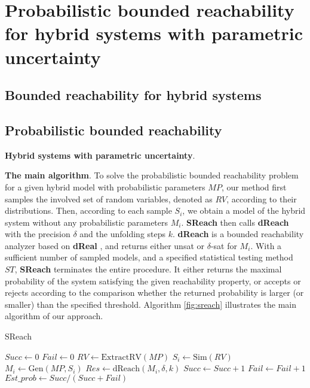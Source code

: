 \section{Probabilistic bounded reachability for hybrid systems with parametric uncertainty}
\subsection{Bounded reachability for hybrid systems}

\subsection{Probabilistic bounded reachability}
{\bf Hybrid systems with parametric uncertainty}.


{\bf The main algorithm}.
To solve the probabilistic bounded reachability problem for a given hybrid model with probabilistic parameters $MP$, our method first samples the involved set of random variables, denoted as $RV$, according to their distributions. Then, according to each sample $S_i$, we obtain a model of the hybrid system without any probabilistic parameters $M_i$. {\bf SReach} then calls {\bf dReach} \cite{gaodelta} with the precision $\delta$ and the unfolding steps $k$. {\bf dReach} is a bounded reachability analyzer based on {\bf dReal} \cite{gao2013dreal}, and returns either unsat or $\delta$-sat for $M_i$. With a sufficient number of sampled models, and a specified statistical testing method $ST$, {\bf SReach} terminates the entire procedure. It either returns the maximal probability of the system satisfying the given reachability property, or accepts or rejects according to the comparison whether the returned probability is larger (or smaller) than the specified threshold. Algorithm \ref{fig:sreach} illustrates the main algorithm of our approach.

\begin{algorithm}
  \centering
  \caption{SReach}
  \label{fig:sreach}
  \begin{algorithmic}[1]
        \State $Succ \gets 0$
        \State $Fail \gets 0$
        \State $RV \gets \mathrm{ExtractRV}(MP)$
        \Repeat
        	   \State $S_i \gets \mathrm{Sim}(RV)$
            \State $M_i \gets \mathrm{Gen}(MP, S_i)$
            \State $Res \gets \mathrm{dReach}(M_i, \delta, k)$
		\State $Succ \gets Succ + 1$
	  \Else
		\State $Fail \gets Fail + 1$
	  \EndIf
        \State $Est\_prob \gets Succ / (Succ + Fail)$
   \EndProcedure
  \end{algorithmic}
\end{algorithm}


